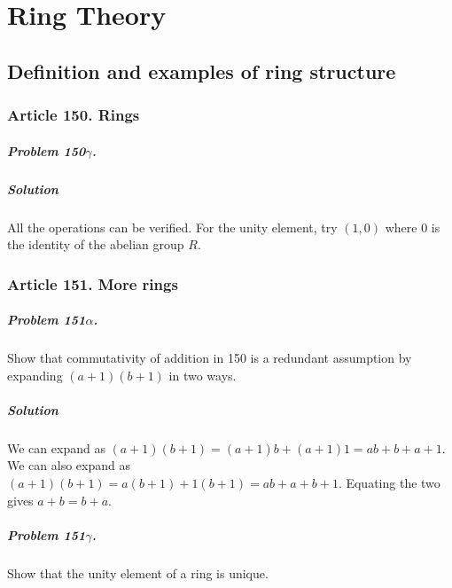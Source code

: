 \newcommand{\ideal}[1]{\mathsf{\mathbf{#1}}}

\chapter{Ring Theory}

\section{Definition and examples of ring structure}


\subsection{Article 150. Rings}

\paragraph{Problem 150$\gamma$.}

\paragraph*{Solution}
All the operations can be verified. For the unity element, try $(1, 0)$ where
$0$ is the identity of the abelian group $R$.

\subsection{Article 151. More rings}

\paragraph{Problem 151$\alpha$.}
Show that commutativity of addition in 150 is a redundant assumption by
expanding $(a+1)(b+1)$ in two ways.

\paragraph*{Solution}
We can expand as $(a+1)(b+1) = (a+1)b + (a+1)1 = ab + b + a + 1$. We can also
expand as $(a+1)(b+1) = a(b+1) + 1(b+1) = ab + a + b + 1$. Equating the two
gives $ a+b = b+a $.

\paragraph{Problem 151$\gamma$.}
Show that the unity element of a ring is unique.

